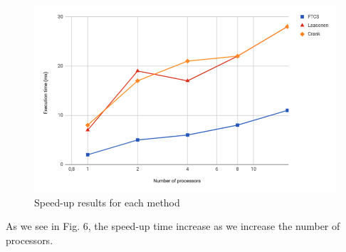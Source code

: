 \documentclass{article}
\begin{document}
            \begin{figure}[H]
                \includegraphics[width=\textwidth]{time_study.png}
                \caption{Speed-up results for each method}
            \end{figure}
            As we see in Fig. 6, the speed-up time increase as we increase the number of processors.
            
\end{document}
